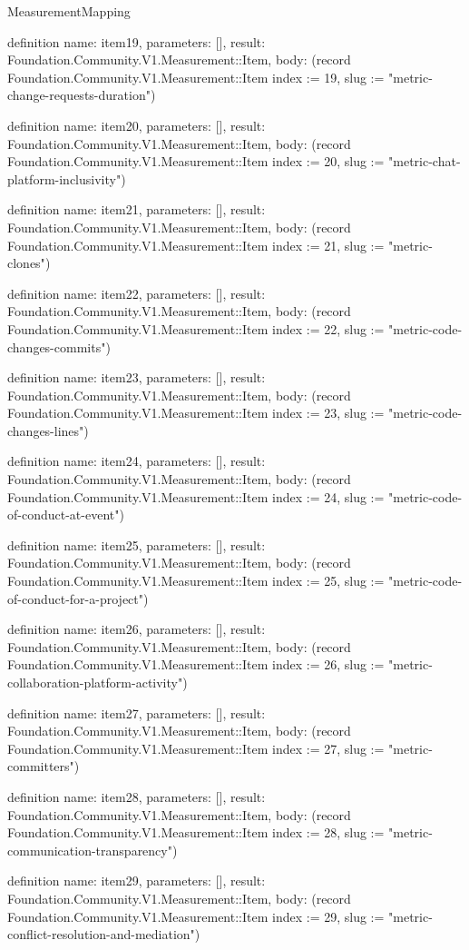 \begin{lexlean}{MeasurementMapping}
\begin{semanticmodule}
definition{
  name: item19,
  parameters: [],
  result: Foundation.Community.V1.Measurement::Item,
  body: (record Foundation.Community.V1.Measurement::Item {index := 19, slug := "metric-change-requests-duration"})
}

definition{
  name: item20,
  parameters: [],
  result: Foundation.Community.V1.Measurement::Item,
  body: (record Foundation.Community.V1.Measurement::Item {index := 20, slug := "metric-chat-platform-inclusivity"})
}

definition{
  name: item21,
  parameters: [],
  result: Foundation.Community.V1.Measurement::Item,
  body: (record Foundation.Community.V1.Measurement::Item {index := 21, slug := "metric-clones"})
}

definition{
  name: item22,
  parameters: [],
  result: Foundation.Community.V1.Measurement::Item,
  body: (record Foundation.Community.V1.Measurement::Item {index := 22, slug := "metric-code-changes-commits"})
}

definition{
  name: item23,
  parameters: [],
  result: Foundation.Community.V1.Measurement::Item,
  body: (record Foundation.Community.V1.Measurement::Item {index := 23, slug := "metric-code-changes-lines"})
}

definition{
  name: item24,
  parameters: [],
  result: Foundation.Community.V1.Measurement::Item,
  body: (record Foundation.Community.V1.Measurement::Item {index := 24, slug := "metric-code-of-conduct-at-event"})
}

definition{
  name: item25,
  parameters: [],
  result: Foundation.Community.V1.Measurement::Item,
  body: (record Foundation.Community.V1.Measurement::Item {index := 25, slug := "metric-code-of-conduct-for-a-project"})
}

definition{
  name: item26,
  parameters: [],
  result: Foundation.Community.V1.Measurement::Item,
  body: (record Foundation.Community.V1.Measurement::Item {index := 26, slug := "metric-collaboration-platform-activity"})
}

definition{
  name: item27,
  parameters: [],
  result: Foundation.Community.V1.Measurement::Item,
  body: (record Foundation.Community.V1.Measurement::Item {index := 27, slug := "metric-committers"})
}

definition{
  name: item28,
  parameters: [],
  result: Foundation.Community.V1.Measurement::Item,
  body: (record Foundation.Community.V1.Measurement::Item {index := 28, slug := "metric-communication-transparency"})
}

definition{
  name: item29,
  parameters: [],
  result: Foundation.Community.V1.Measurement::Item,
  body: (record Foundation.Community.V1.Measurement::Item {index := 29, slug := "metric-conflict-resolution-and-mediation"})
}


\end{semanticmodule}
\end{lexlean}
